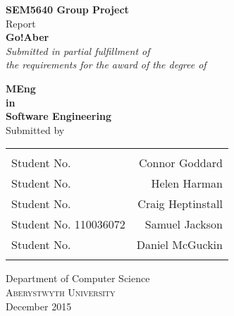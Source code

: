 \begin{titlepage}

\begin{center}

\textup{\small {\bf SEM5640 Group Project} \\ Report}\\[0.2in]

\Large \textbf {Go!Aber}\\[0.5in]

       \small \emph{Submitted in partial fulfillment of\\
        the requirements for the award of the degree of}
        \vspace{.2in}

       {\bf MEng  \\in\\ Software Engineering}\\[0.5in]

\normalsize Submitted by \\
\begin{table}[h]
\centering
\begin{tabular}{lr}\hline \\
Student No. & Connor Goddard \\
Student No. & Helen Harman \\ 
Student No. & Craig Heptinstall \\
Student No. 110036072 & Samuel Jackson \\ 
Student No. & Daniel McGuckin \\ \\ \hline 
\end{tabular}
\end{table}

\vspace{.1in}

\Large{Department of Computer Science}\\
\normalsize
\textsc{Aberystwyth University}\\
\vspace{4.2cm}
December 2015

\end{center}

\end{titlepage}
